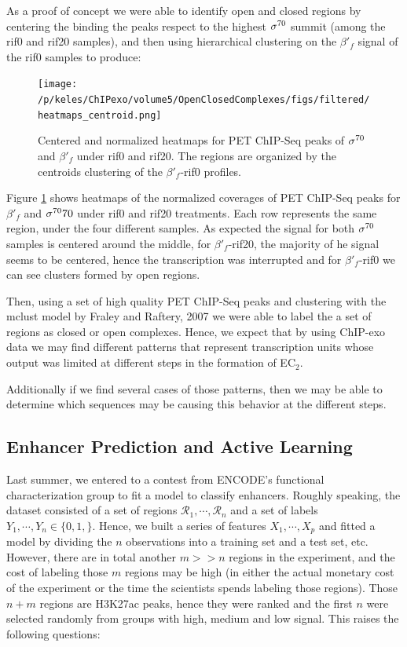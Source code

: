 \documentclass[11pt]{article}\usepackage[]{graphicx}\usepackage[]{color}
\begin{document}
As a proof of concept we were able to identify open and closed regions
by centering the binding the peaks respect to the highest $\sigma^{70}$
summit (among the rif0 and rif20 samples), and then using hierarchical
clustering on the $\beta'_f$ signal of the rif0 samples to produce:

\begin{figure}[H]
  \centering
 \texttt{[image: /p/keles/ChIPexo/volume5/OpenClosedComplexes/figs/filtered/heatmaps\_centroid.png]}
 \caption{Centered and normalized heatmaps for PET ChIP-Seq peaks of
   $\sigma^{70}$ and $\beta'_f$ under rif0 and rif20. The regions are
   organized by the centroids clustering of the $\beta'_f$-rif0
   profiles.}
  \label{fig:hm1}
\end{figure}

Figure \ref{fig:hm1} shows heatmaps of the normalized coverages of PET
ChIP-Seq peaks for $\beta'_f$ and $\sigma^{70}70$ under rif0 and rif20
treatments. Each row represents the same region, under the four
different samples. As expected the signal for both $\sigma^{70}$ samples is
centered around the middle, for $\beta'_f$-rif20, the majority of he
signal seems to be centered, hence the transcription was interrupted
and for $\beta'_f$-rif0 we can see clusters formed by open regions.

Then, using a set of high quality PET ChIP-Seq peaks and clustering
with the mclust model by Fraley and Raftery, 2007 \cite{mclust} we
were able to label the a set of regions as closed or open
complexes. Hence, we expect that by using ChIP-exo data we may find
different patterns that represent transcription units whose output was
limited at different steps in the formation of EC$_2$.

Additionally if we find several cases of those patterns, then we may
be able to determine which sequences may be causing this behavior at
the different steps.

\subsection{Enhancer Prediction and Active Learning}
\label{sec:enhancer}

Last summer, we entered to a contest from ENCODE's functional
characterization group to fit a model to classify enhancers. Roughly
speaking, the dataset consisted of a set of regions
$\mathcal{R}_1,\cdots,\mathcal{R}_n$ and a set of labels
$Y_1,\cdots,Y_n \in \{0,1,\}$. Hence, we built a series of features
$X_1,\cdots,X_p$ and fitted a model by dividing the $n$ observations
into a training set and a test set, etc. However, there are in total
another $m >> n$ regions in the experiment, and the cost of labeling
those $m$ regions may be high (in either the actual monetary cost of
the experiment or the time the scientists spends labeling those
regions). Those $n+m$ regions are H3K27ac peaks, hence they were
ranked and the first $n$ were selected randomly from groups with high,
medium and low signal. This raises the following questions:
\end{document}
